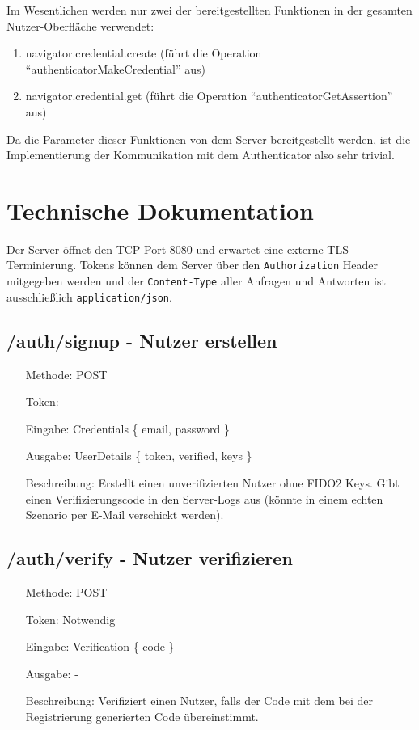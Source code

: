 \documentclass[journal]{IEEEtran}
\begin{document}
Im Wesentlichen werden nur zwei der bereitgestellten Funktionen in der gesamten
Nutzer-Oberfläche verwendet:

\begin{enumerate}
	\item navigator.credential.create (führt die Operation
		``authenticatorMakeCredential'' aus)
	\item navigator.credential.get (führt die Operation
		``authenticatorGetAssertion'' aus)
\end{enumerate}

Da die Parameter dieser Funktionen von dem Server bereitgestellt werden, ist
die Implementierung der Kommunikation mit dem Authenticator also sehr trivial.

\section{Technische Dokumentation}\label{docs}

Der Server öffnet den TCP Port 8080 und erwartet eine externe TLS
Terminierung. Tokens können dem Server über den \texttt{Authorization} Header
mitgegeben werden und der \texttt{Content-Type} aller Anfragen und Antworten
ist ausschließlich \texttt{application/json}.

\subsection{/auth/signup - Nutzer erstellen}

\begin{itemize}
	\setlength{\leftskip}{1.5cm}
	\setlength{\itemsep}{0pt}
	\item[Methode:] POST
	\item[Token:] -
	\item[Eingabe:] Credentials \{ email, password \}
	\item[Ausgabe:] UserDetails \{ token, verified, keys \}
	\item[Beschreibung:] Erstellt einen unverifizierten Nutzer ohne FIDO2 Keys.
		Gibt einen Verifizierungscode in den Server-Logs aus (könnte in einem
		echten Szenario per E-Mail verschickt werden).
\end{itemize}

\subsection{/auth/verify - Nutzer verifizieren}

\begin{itemize}
	\setlength{\leftskip}{1.5cm}
	\setlength{\itemsep}{0pt}
	\item[Methode:] POST
	\item[Token:] Notwendig
	\item[Eingabe:] Verification \{ code \}
	\item[Ausgabe:] -
	\item[Beschreibung:] Verifiziert einen Nutzer, falls der Code mit dem bei
		der Registrierung generierten Code übereinstimmt.
\end{itemize}
\end{document}
